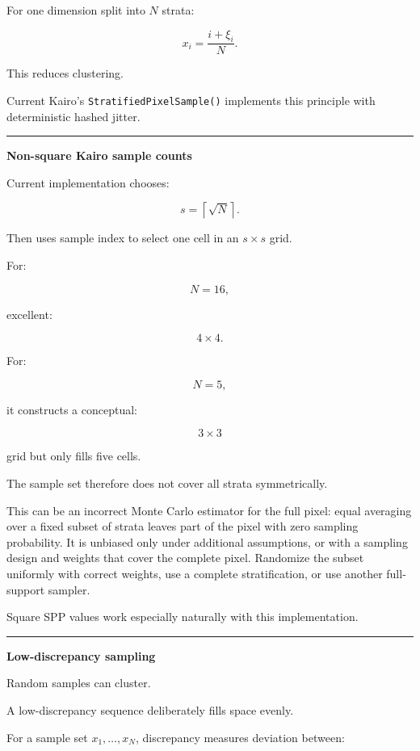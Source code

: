 For one dimension split into \(N\) strata:

\[
x_i=
\frac{i+\xi_i}{N}.
\]

This reduces clustering.

Current Kairo's \texttt{StratifiedPixelSample()} implements this principle with deterministic hashed jitter.

\begin{center}\rule{0.5\linewidth}{0.5pt}\end{center}

\textbf{Non-square Kairo sample counts}

Current implementation chooses:

\[
s=
\left\lceil\sqrt N\right\rceil.
\]

Then uses sample index to select one cell in an \(s\times s\) grid.

For:

\[
N=16,
\]

excellent:

\[
4\times4.
\]

For:

\[
N=5,
\]

it constructs a conceptual:

\[
3\times3
\]

grid but only fills five cells.

The sample set therefore does not cover all strata symmetrically.

This can be an incorrect Monte Carlo estimator for the full pixel: equal averaging over a fixed subset of strata leaves part of the pixel with zero sampling probability. It is unbiased only under additional assumptions, or with a sampling design and weights that cover the complete pixel. Randomize the subset uniformly with correct weights, use a complete stratification, or use another full-support sampler.

Square SPP values work especially naturally with this implementation.

\begin{center}\rule{0.5\linewidth}{0.5pt}\end{center}

\textbf{Low-discrepancy sampling}

Random samples can cluster.

A low-discrepancy sequence deliberately fills space evenly.

For a sample set \(x_1,\dots,x_N\), discrepancy measures deviation between:

